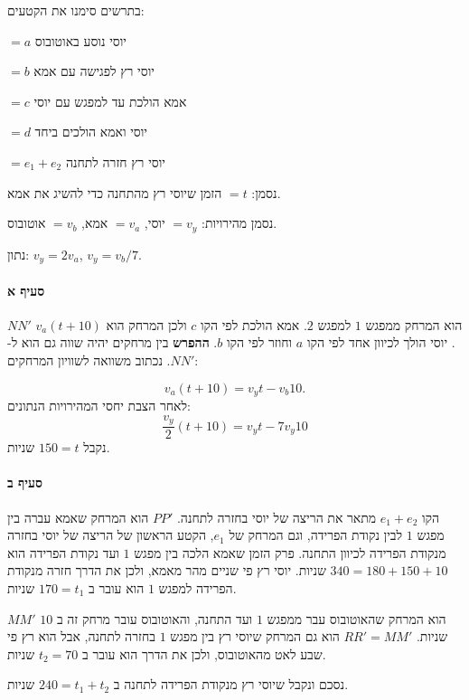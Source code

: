 \documentclass[12pt,a4paper]{article}
\begin{document}
\newpage

בתרשים סימנו את הקטעים:

$=a$
יוסי נוסע באוטובוס

$=b$
יוסי רץ לפגישה עם אמא

$=c$
אמא הולכת עד למפגש עם יוסי

$=d$
יוסי ואמא הולכים ביחד

$=e_1+e_2$
יוסי רץ חזרה לתחנה

\smallskip

נסמן:
$=t$
הזמן שיוסי רץ מהתחנה כדי להשיג את אמא.

\smallskip
נסמן מהירויות:
$=v_y$
יוסי, 
$=v_a$
אמא, 
$=v_b$
אוטובוס.

\smallskip

נתון:
$v_y=2v_a$, $v_y=v_b/7$.

\paragraph{סעיף א}

$NN'$
הוא המרחק ממפגש
$1$
למפגש
$2$.
אמא הולכת לפי הקו
$c$
ולכן המרחק הוא
$v_a(t+10)$.
יוסי הולך לכיוון אחד לפי הקו
$a$
וחוזר לפי הקו
$b$.
\textbf{ההפרש}
בין מרחקים יהיה שווה גם הוא ל-
$NN'$.
נכתוב משוואה לשוויון המרחקים:

\[
v_a(t+10) = v_yt - v_b 10.
\]
לאחר הצבת יחסי המהירויות הנתונים:
\[
\frac{v_y}{2}(t+10) = v_yt - 7v_y 10
\]
נקבל 
$150=t$
שניות.

\paragraph{סעיף ב}

הקו
$e_1+e_2$
מתאר את הריצה של יוסי בחזרה לתחנה.
$PP'$
הוא המרחק שאמא עברה בין מפגש
$1$
לבין נקודת הפרידה, וגם המרחק של
$e_1$,
הקטע הראשון של הריצה של יוסי בחזרה מנקודת הפרידה לכיוון התחנה. פרק הזמן שאמא הלכה בין מפגש
$1$
ועד נקודת הפרידה הוא
$340=180+150+10$
שניות. יוסי רץ פי שניים מהר מאמא, ולכן את הדרך חזרה מנקודת הפרידה למפגש
$1$
הוא עובר ב
$170=t_1$
שניות.

\smallskip

$MM'$
הוא המרחק שהאוטובוס עבר ממפגש
$1$
ועד התחנה, והאוטובוס עובר מרחק זה ב
$10$
שניות.
$RR'=MM'$
הוא גם המרחק שיוסי רץ בין מפגש
$1$
בחזרה לתחנה, אבל הוא רץ פי שבע לאט מהאוטובוס, ולכן את הדרך הוא עובר ב
$t_2=70$
שניות.

\smallskip

נסכם ונקבל שיוסי רץ מנקודת הפרידה לתחנה ב
$240=t_1+t_2$
שניות.

\newpage
\end{document}
